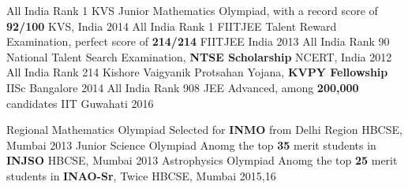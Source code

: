 \begin{cvhonors}
  \cvhonor
    {All India Rank 1}
    {KVS Junior Mathematics Olympiad, with a record score of \textbf{92/100}}
    {KVS, India}
    {2014}
  \cvhonor
    {All India Rank 1}
    {FIITJEE Talent Reward Examination, perfect score of \textbf{214/214}}
    {FIITJEE India}
    {2013}
  \cvhonor
    {All India Rank 90}
    {National Talent Search Examination, \textbf{NTSE Scholarship}}
    {NCERT, India}
    {2012}
  \cvhonor
    {All India Rank 214}
    {Kishore Vaigyanik Protsahan Yojana, \textbf{KVPY Fellowship}}
    {IISc Bangalore}
    {2014}
  \cvhonor
    {All India Rank 908}
    {JEE Advanced, among \textbf{200,000} candidates}
    {IIT Guwahati}
    {2016}
\end{cvhonors}

\begin{cvhonors}
  \cvhonor
    {Regional Mathematics Olympiad}
    {Selected for \textbf{INMO} from Delhi Region}
    {HBCSE, Mumbai}
    {2013}
  \cvhonor
    {Junior Science Olympiad}
    {Anomg the top \textbf{35} merit students in \textbf{INJSO} }
    {HBCSE, Mumbai}
    {2013}
  \cvhonor
    {Astrophysics Olympiad}
    {Anomg the top \textbf{25} merit students in \textbf{INAO-Sr}, Twice}
    {HBCSE, Mumbai}
    {2015,16}
\end{cvhonors}
